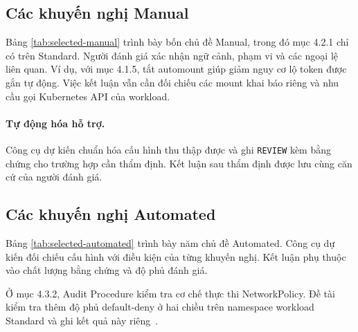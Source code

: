 \subsection{Các khuyến nghị Manual}
\label{subsec:selected-manual}

Bảng \ref{tab:selected-manual} trình bày bốn chủ đề Manual, trong đó mục 4.2.1 chỉ có trên Standard. Người đánh giá xác nhận ngữ cảnh, phạm vi và các ngoại lệ liên quan. Ví dụ, với mục 4.1.5, tắt automount giúp giảm nguy cơ lộ token được gắn tự động. Việc kết luận vẫn cần đối chiếu các mount khai báo riêng và nhu cầu gọi Kubernetes API của workload.

\paragraph{Tự động hóa hỗ trợ.}
Công cụ dự kiến chuẩn hóa cấu hình thu thập được và ghi \texttt{REVIEW} kèm bằng chứng cho trường hợp cần thẩm định. Kết luận sau thẩm định được lưu cùng căn cứ của người đánh giá.



\subsection{Các khuyến nghị Automated}
\label{subsec:selected-automated}

Bảng \ref{tab:selected-automated} trình bày năm chủ đề Automated. Công cụ dự kiến đối chiếu cấu hình với điều kiện của từng khuyến nghị. Kết luận phụ thuộc vào chất lượng bằng chứng và độ phủ đánh giá.

Ở mục 4.3.2, Audit Procedure kiểm tra cơ chế thực thi NetworkPolicy. Đề tài kiểm tra thêm độ phủ default-deny ở hai chiều trên namespace workload Standard và ghi kết quả này riêng~\mbox{}.


